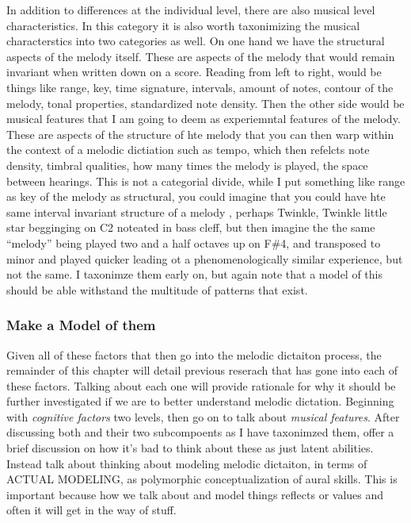 \documentclass[]{book}
\theoremstyle{definition}
\theoremstyle{definition}
\theoremstyle{definition}
\theoremstyle{remark}
\begin{document}
In addition to differences at the individual level, there are also
musical level characteristics. In this category it is also worth
taxonimizing the musical characterstics into two categories as well. On
one hand we have the structural aspects of the melody itself. These are
aspects of the melody that would remain invariant when written down on a
score. Reading from left to right, would be things like range, key, time
signature, intervals, amount of notes, contour of the melody, tonal
properties, standardized note density. Then the other side would be
musical features that I am going to deem as experiemntal features of the
melody. These are aspects of the structure of hte melody that you can
then warp within the context of a melodic dictiation such as tempo,
which then refelcts note density, timbral qualities, how many times the
melody is played, the space between hearings. This is not a categorial
divide, while I put something like range as key of the melody as
structural, you could imagine that you could have hte same interval
invariant structure of a melody , perhaps Twinkle, Twinkle little star
begginging on C2 noteated in bass cleff, but then imagine the the same
``melody'' being played two and a half octaves up on F\#4, and
transposed to minor and played quicker leading ot a phenomenologically
similar experience, but not the same. I taxonimze them early on, but
again note that a model of this should be able withstand the multitude
of patterns that exist.

\hypertarget{make-a-model-of-them}{%
\subsubsection{Make a Model of them}\label{make-a-model-of-them}}

Given all of these factors that then go into the melodic dictaiton
process, the remainder of this chapter will detail previous reserach
that has gone into each of these factors. Talking about each one will
provide rationale for why it should be further investigated if we are to
better understand melodic dictation. Beginning with \emph{cognitive
factors} two levels, then go on to talk about \emph{musical features}.
After discussing both and their two subcompoents as I have taxonimzed
them, offer a brief discussion on how it's bad to think about these as
just latent abilities. Instead talk about thinking about modeling
melodic dictaiton, in terms of ACTUAL MODELING, as polymorphic
conceptualization of aural skills. This is important because how we talk
about and model things reflects or values and often it will get in the
way of stuff.
\end{document}
